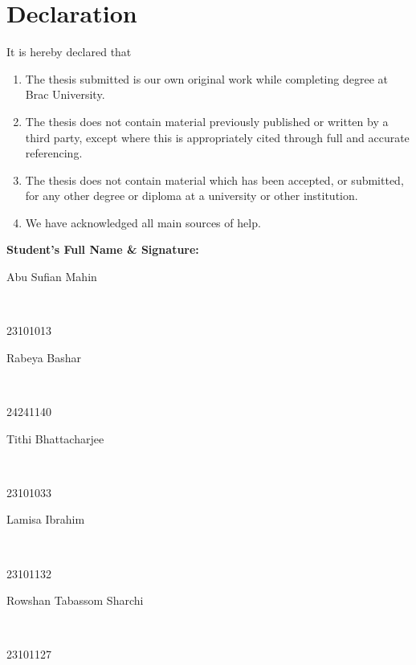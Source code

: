 \newcommand*\wildcard[2][6cm]{\vspace{2cm}\parbox{#1}{\hrulefill\par#2}} 


\section*{Declaration}

It is hereby declared that

\begin{enumerate} %
  \item The thesis submitted is our own original work while completing degree at Brac University.
  \item The thesis does not contain material previously published or written by a third party, except where this is appropriately cited through full and accurate referencing.
  \item The thesis does not contain material which has been accepted, or submitted, for any other degree or diploma at a university or other institution.
  \item We have acknowledged all main sources of help.
\end{enumerate}

\vspace{1cm}
\textbf{Student’s Full Name \& Signature:} %

\begingroup

    \begin{center}
        \wildcard{\centerline{Abu Sufian Mahin} ~\\ \centerline{23101013}}
        \hspace{2cm}
        \wildcard{\centerline{Rabeya Bashar} ~\\ \centerline{24241140} }
        \wildcard{\centerline{Tithi Bhattacharjee} ~\\
         \centerline{23101033} }
        \hspace{2cm}
        \wildcard{\centerline{Lamisa Ibrahim} ~\\ \centerline{23101132} }
        \wildcard{\centerline{Rowshan Tabassom Sharchi} ~\\
        \centerline{23101127} }
        
    \end{center}

\endgroup


\pagebreak





